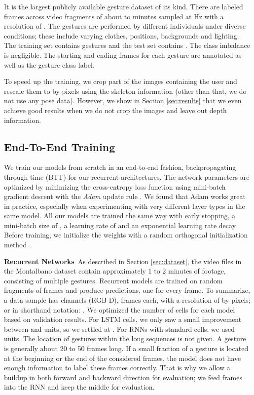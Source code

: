 \documentclass[11pt,a4paper]{article} \usepackage{a4wide}
\begin{document}
It is the largest publicly available gesture dataset of its kind. There are  labeled frames across  video fragments of about  to  minutes sampled at Hz with a resolution of . The gestures are performed by  different individuals under diverse conditions; these include varying clothes, positions, backgrounds and lighting. The training set contains  gestures and the test set contains . The class imbalance is negligible. The starting and ending frames for each gesture are annotated as well as the gesture class label.

To speed up the training, we crop part of the images containing the user and rescale them to  by  pixels using the skeleton information (other than that, we do not use any pose data).
However, we show in Section \ref{sec:results} that we even achieve good results when we do not crop the images and leave out depth information.

\subsection{End-To-End Training} \label{sec:train}

We train our models from scratch in an end-to-end fashion, backpropagating through time (BTT) for our recurrent architectures. The network parameters are optimized by minimizing the cross-entropy loss function using mini-batch gradient descent with the \emph{Adam} update rule \citep{kingma2014adam}. 
We found that Adam works great in practice, especially when experimenting with very different layer types in the same model.  
All our models are trained the same way with early stopping, a mini-batch size of , a learning rate of  and an exponential learning rate decay. 
Before training, we initialize the weights with a random orthogonal initialization method \citep{saxe2013exact}.


\textbf{Recurrent Networks}\, As described in Section \ref{sec:dataset}, the video files in the Montalbano dataset contain approximately 1 to 2 minutes of footage, consisting of multiple gestures. Recurrent models are trained on random fragments of  frames and produce  predictions, one for every frame. To summarize, a data sample has  channels (RGB-D),  frames each, with a resolution of  by  pixels; or in shorthand notation: . We optimized the number of cells for each model based on validation results. For LSTM cells, we only saw a small improvement between  and  units, so we settled at . For RNNs with standard cells, we used  units. 
The location of gestures within the long sequences is not given. A gesture is generally about 20 to 50 frames long. If a small fraction of a gesture is located at the beginning or the end of the  considered frames, the model does not have enough information to label these frames correctly. That is why we allow a buildup in both forward and backward direction for evaluation; we feed  frames into the RNN and keep the middle  for evaluation.
\end{document}

